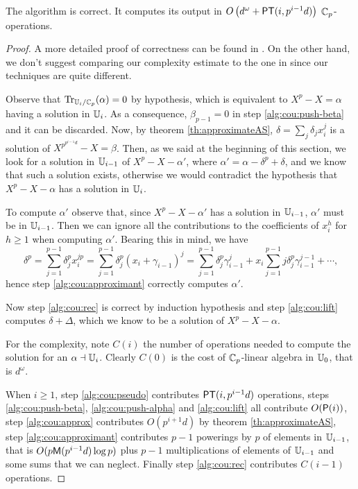 \sloppy
\begin{theorem}
  The algorithm  is correct. It computes its
  output in $O\left(d^\omega + \mathrm{\sf PT}(i,p^{i-1}d)\right)$ $\mathbb{C}_p$-operations.
\end{theorem}
\fussy
\begin{proof}
  A more detailed proof of correctness can be found in
  \cite{Cou00}. On the other hand, we don't suggest comparing our
  complexity estimate to the one in \cite{Cou00} since our techniques
  are quite different. %
  
  Observe that $\operatorname{Tr}_{\mathbb{U}_i/\mathbb{C}_p}(\alpha)=0$ by hypothesis, which is
  equivalent to $X^p-X=\alpha$ having a solution in $\mathbb{U}_i$. As a
  consequence, $\beta_{p-1}=0$ in step \ref{alg:cou:push-beta} and it
  can be discarded. Now, by theorem \ref{th:approximateAS},
  $\delta=\sum_j\delta_jx_i^j$ is a solution of
  $X^{p^{p^{i-1}d}}-X=\beta$. Then, as we said at the beginning of
  this section, we look for a solution in $\mathbb{U}_{i-1}$ of
  $X^p-X-\alpha'$, where $\alpha'=\alpha-\delta^p+\delta$, and we know
  that such a solution exists, otherwise we would contradict the
  hypothesis that $X^p-X-\alpha$ has a solution in $\mathbb{U}_i$.

  To compute $\alpha'$ observe that, since $X^p-X-\alpha'$ has a
  solution in $\mathbb{U}_{i-1}$, $\alpha'$ must be in $\mathbb{U}_{i-1}$. Then we can
  ignore all the contributions to the coefficients of $x_i^h$ for
  $h\ge1$ when computing $\alpha'$. Bearing this in mind, we have
  \begin{equation*}
    \delta^p = \sum_{j=1}^{p-1}\delta_j^px_i^{jp} =
    \sum_{j=1}^{p-1}\delta_j^p(x_i + \gamma_{i-1})^j =
    \sum_{j=1}^{p-1}\delta_j^p\gamma_{i-1}^j +
    x_i\sum_{j=1}^{p-1}j\delta_j^p\gamma_{i-1}^{j-1} + \cdots
    \text{,}
  \end{equation*}
  hence step \ref{alg:cou:approximant} correctly computes $\alpha'$.

  Now step \ref{alg:cou:rec} is correct by induction hypothesis and
  step \ref{alg:cou:lift} computes $\delta+\Delta$, which we know to
  be a solution of $X^p-X-\alpha$.

  For the complexity, note $C(i)$ the number of operations needed to
  compute the solution for an $\alpha\dashv\mathbb{U}_i$. Clearly $C(0)$ is the
  cost of $\mathbb{C}_p$-linear algebra in $\mathbb{U}_0$, that is $d^\omega$.

  When $i\ge1$, step \ref{alg:cou:pseudo} contributes
  $\mathrm{\sf PT}(i,p^{i-1}d)$ operations, steps \ref{alg:cou:push-beta},
  \ref{alg:cou:push-alpha} and \ref{alg:cou:lift} all contribute
  $O(\mathrm{\sf P}(i))$, step \ref{alg:cou:approx} contributes $O(p^{i+1}d)$
  by theorem \ref{th:approximateAS}, step \ref{alg:cou:approximant}
  contributes $p-1$ powerings by $p$ of elements in $\mathbb{U}_{i-1}$, that
  is $O(p\mathrm{\sf M}(p^{i-1}d)\log p)$ plus $p-1$ multiplications of elements
  of $\mathbb{U}_{i-1}$ and some sums that we can neglect. Finally step
  \ref{alg:cou:rec} contributes $C(i-1)$ operations.


\end{proof}
